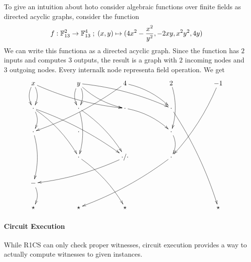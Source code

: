 \begin{example} To give an intuition about hoto consider algebraic functions over finite fields as directed acyclic graphs, consider the function
$$
f:\mathbb{F}_{13}^2 \to \mathbb{F}_{13}^4\;;\;
(x,y) \mapsto (4x^2 - \frac{x^2}{y^2},- 2xy,  x^2y^2, 4y)
$$
We can write this functiona as a directed acyclic graph. Since the function has $2$ inputs and computes $3$ outputs, the result is a graph with $2$ incoming nodes and $3$ outgoing nodes. Every internalk node representa field operation. We get
\begingroup
    \fontsize{8pt}{10pt}\selectfont
\[
\xymatrix{
x\ar@/^/[d]\ar@/_/[d]  \ar@/_/[drrrr]   &  & 
y\ar@/^/[d]\ar@/_/[d]\ar@/_/[drr] \ar@/^/[drrrr] & & 
4\ar@/^/[ddllll] \ar@/^/[drr]& & 
2 \ar@/^/[dd] & & 
-1\ar@/^/[dddll]\\
\cdot \ar@/^/[d]\ar@/^/[ddrr] \ar@/^/[ddrrrr]&  & 
\cdot \ar@/^/[dd] \ar@/^/[ddrr]& & 
\cdot \ar@/^/[drr] & & 
\cdot \ar@/^/[ddddrr]\\
\cdot \ar@/^/[dd]& & 
\cdot & & 
 & & 
\cdot \ar@/^/[d]\\
 & & 
\cdot \ar@/^/[ddrr]& & 
\cdot/\cdot \ar@/^/[dllll] & & 
\cdot \ar@/^/[ddllll]\\
- \ar@/^/[d] & & 
 & & 
 & & 
\\
\star & & 
\star & & 
\star & & 
& & 
\star
}
\]  
\endgroup
\end{example}

\paragraph{Circuit Execution}
 While R1CS can only check proper witnesses, circuit execution provides a way to actually compute witnesses to given instances. 

 
  

